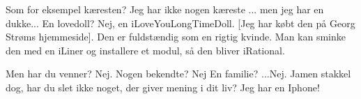 \documentclass[a4paper,11pt]{article}
\begin{document}
\begin{sketch}
 Som for eksempel kæresten?
 Jeg har ikke nogen kæreste ... men jeg har en dukke...
 En lovedoll?
 Nej, en iLoveYouLongTimeDoll. [Jeg har købt den på Georg Strøms 
hjemmeside]. Den er fuldstændig som en rigtig kvinde. Man kan sminke den 
med en iLiner og installere et modul, så den bliver iRational.

 Men har du venner?
 Nej.
 Nogen bekendte?
  Nej
 En familie?
 ...Nej.
 Jamen stakkel dog, har du slet ikke noget, der giver mening i dit 
liv?
  Jeg har en Iphone!


\end{sketch}
\end{document}
